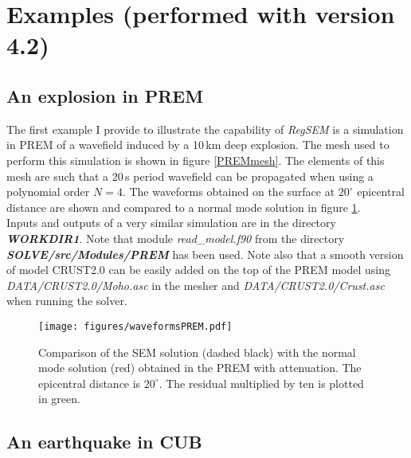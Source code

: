 \section{Examples (performed with version 4.2)}


\subsection{An explosion in PREM}
\label{expl_PREM}

The first example I provide to illustrate the capability of \textit{RegSEM} is a simulation in PREM
 of a wavefield induced by a 10\,km deep explosion. The mesh used to perform this simulation is
shown in figure \ref{PREMmesh}. The elements of this mesh are such that a 20\,s period wavefield can be
propagated when using a polynomial order $N=4$. The waveforms obtained on the surface at $\mbox{20}^{\circ}$
epicentral distance are shown and compared to a normal mode solution in figure \ref{wavePREM}.\\
Inputs and outputs of a very similar simulation are in the directory \textit{\bfseries WORKDIR1}. Note that
module \textit{read\_model.f90} from the directory \textit{\bfseries SOLVE/src/Modules/PREM} has been
used. Note also that a smooth version of model CRUST2.0  can be easily added on the top of
the PREM model using \textit{DATA/CRUST2.0/Moho.asc} in the mesher and \textit{DATA/CRUST2.0/Crust.asc}
when running the solver.

\begin{figure}
\vspace{-2cm}
\hspace{1cm}
\centerline{\texttt{[image: figures/waveformsPREM.pdf]}}
\vspace{-1.5cm}
\caption{Comparison of the SEM solution (dashed black) with the normal mode
solution (red) obtained in the PREM with attenuation. The epicentral distance is
$\mbox{20}^{\circ}$. The residual multiplied by ten is plotted in green.}
\label{wavePREM}
\end{figure}


\subsection{An earthquake in CUB}
\label{expl_CUB}

